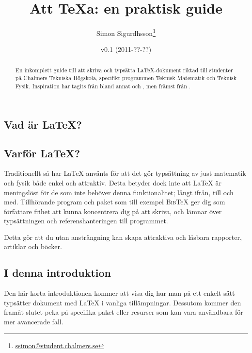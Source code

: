 \documentclass[swe,12pt]{skrapport}
\makeatletter
\newcommand\BibTeX{\textsc{Bib}\TeX}					%
\let\section@old=\section
\renewcommand\section{\@ifstar\my@section@star\my@section}
\newcommand\my@section[2][\@empty]{\newpage\ifx\@empty#1\section@old{#2}\else\section@old[#1]{#2}\fi}
\newcommand\my@section@star[2][\@empty]{\newpage\ifx\@empty#1\section@old*{#2}\else\section@old*[#1]{#2}\fi}
\makeatother
\begin{document}
	\begin{titlepage} %
		\title{Att \TeX{}a: en praktisk guide}
		\author{Simon Sigurdhsson\thanks{\url{ssimon@student.chalmers.se}}}
		\date{v0.1 (2011-??-??)}
		\maketitle
		\begin{abstract}
			En inkomplett guide till att skriva och typsätta \LaTeX-dokument riktad
			till studenter på Chalmers Tekniska Högskola, specifikt programmen
			Teknisk Matematik och Teknisk Fysik.
			Inspiration har tagits från bland annat  och
			, men främst från .
		\end{abstract}
	\end{titlepage} %
	
	\section*{Inledning}
	\subsection{Vad är \LaTeX?}
	
	\subsection{Varför \LaTeX?}
	Traditionellt så har \LaTeX{} använts för att det gör typsättning av just
	matematik och fysik både enkel och attraktiv. Detta betyder dock inte att
	\LaTeX{} är meningslöst för de som inte behöver denna funktionalitet; långt
	ifrån, till och med. Tillhörande program och paket som till exempel
	\BibTeX{} ger dig som författare frihet att kunna koncentrera dig på att
	skriva, och lämnar över typsättningen och referenshanteringen till
	programmet.
	
	Detta gör att du utan ansträngning kan skapa attraktiva och läsbara
	rapporter, artiklar och böcker.
	
	\subsection{I denna introduktion}
	Den här korta introduktionen kommer att visa dig hur man på ett enkelt
	sätt typsätter dokument med \LaTeX{} i vanliga tillämpningar.
	Dessutom kommer den framåt slutet peka på specifika paket eller
	resurser som kan vara användbara för mer avancerade fall.
	
\end{document}
